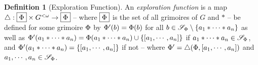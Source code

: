 \documentclass[a4paper,twoside,12pt,openany]{report}
\theoremstyle{plain}
\newtheorem{lemma}{Lemma}
\theoremstyle{definition}
\newtheorem{definition}{Definition}
\theoremstyle{remark}
\begin{document}
\begin{definition}[Exploration Function]
	An \emph{exploration function} is a map \(\triangle:\grimset \times G^{<\omega} \to \grimset\) -- where \(\grimset\) is the set of all grimoires of \(G\) and \(*\) -- be defined for some grimoire \(\Phi\) by \(\Phi'(b) = \Phi(b)\) for all \(b\in \mathscr{S}_{\Phi} \setminus\left\{ a_1*\cdots*a_n \right\}\) as well as \(\Phi'(a_1*\cdots*a_n) = \Phi(a_1*\cdots*a_n)\cup\left\{ \left[ a_1,\cdots,a_n \right] \right\}\) if \(a_1*\cdots*a_n\in \mathscr{S}_{\Phi}\), and \(\Phi'(a_1*\cdots*a_n) = \left\{ \left[ a_1,\cdots,a_n \right] \right\}\) if not -- where \(\Phi' = \triangle(\Phi, \left[ a_1,\cdots,a_n \right])\) and \(a_1,\cdots, a_n \in \mathscr{S}_{\Phi}\).

\end{definition}
\end{document}
